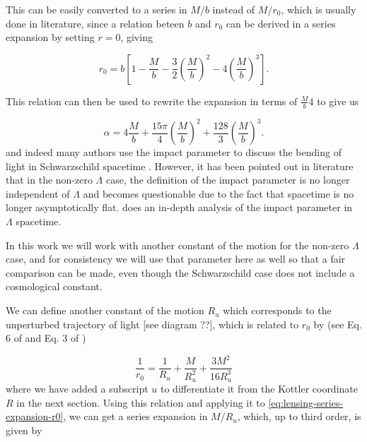This can be easily converted to a series in $M/b$ instead of $M/r_0$, which is usually done in literature, since a relation beteen $b$ and $r_0$ can be derived in a series expansion by setting $\dot{r} = 0$, giving \citep{keeton2005formalism}

\begin{equation}
  r_0 = b \left [ 1 - \frac{M}{b} - \frac{3}{2} \left ( \frac{M}{b}\right)^2 - 4\left ( \frac{M}{b}\right)^3 \right ].
  \label{eq:b-r0-relation}
\end{equation} 

This relation can then be used to rewrite the expansion in terms of $\frac{M}{b}4$ to give us

\begin{equation}
  \alpha = 4 \frac{M}{b} + \frac{15\pi}{4} \left ( \frac{M}{b} \right )^2 + \frac{128}{3} \left ( \frac{M}{b} \right )^3.
  \label{eq:series-expansion-b}
\end{equation}
and indeed many authors use the impact parameter to discuss the bending of light in Schwarzschild spacetime \citep{wald2010general,misner2017gravitation,butcher2016no}. However, it has been pointed out in literature that \citep{ishak2008new,hammad2013note} in the non-zero $\Lambda$ case, the definition of the impact parameter is no longer independent of $\Lambda$ and becomes questionable due to the fact that spacetime is no longer asymptotically flat. \citet{lebedev2013influence} does an in-depth analysis of the impact parameter in $\Lambda$ spacetime. 

In this work we will work with another constant of the motion for the non-zero $\Lambda$ case, and for consistency we will use that parameter here as well so that a fair comparison can be made, even though the Schwarzschild case does not include a cosmological constant.

We can define another constant of the motion $R_u$ which corresponds to the unperturbed trajectory of light [see diagram ??], which is related to $r_0$ by (see Eq. 6 of \citet{ishak2008new} and Eq. 3 of \citet{butcher2016no})

\begin{equation}
  \frac{1}{r_0} = \frac{1}{R_u} + \frac{M}{R_u^2} + \frac{3M^2}{16R_u^3}
  \label{eq:r0-R-relation}
\end{equation}
where we have added a subscript $u$ to differentiate it from the Kottler coordinate $R$ in the next section. Using this relation and applying it to \autoref{eq:lensing-series-expansion-r0}, we can get a series expansion in $M/R_u$, which, up to third order, is given by


